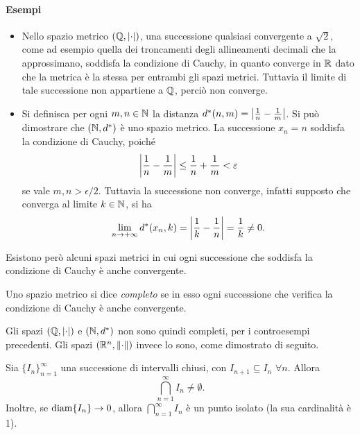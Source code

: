 \paragraph{Esempi}
\begin{itemize}
\item Nello spazio metrico $(\Q,\abs{\cdot})$, una successione qualsiasi convergente a $\sqrt{2}$, come ad esempio quella dei troncamenti degli allineamenti decimali che la approssimano, soddisfa la condizione di Cauchy, in quanto converge in $\R$ dato che la metrica è la stessa per entrambi gli spazi metrici. Tuttavia il limite di tale successione non appartiene a $\Q$, perciò non converge.
\item Si definisca per ogni $m,n\in\N$ la distanza $d^*(n,m)=\abs[\big]{\frac1{n}-\frac1{m}}$. Si può dimostrare che $(\N,d^*)$ è uno spazio metrico. La successione $x_n=n$ soddisfa la condizione di Cauchy, poiché
\[
	\abs[\bigg]{\frac1{n}-\frac1{m}}\leq\frac1{n}+\frac1{m}<\epsilon
\]
se vale $m,n>\epsilon/2$. Tuttavia la successione non converge, infatti supposto che converga al limite $k\in\N$, si ha
\[
	\lim_{n\to +\infty} d^*(x_n,k)=\abs[\bigg]{\frac1{k}-\frac1{n}}=\frac1{k}\neq 0.
\]
\end{itemize}
Esistono però alcuni spazi metrici in cui ogni successione che soddisfa la condizione di Cauchy è anche convergente.
\begin{definizione}
Uno spazio metrico si dice \emph{completo} se in esso ogni successione che verifica la condizione di Cauchy è anche convergente.
\end{definizione}
Gli spazi $(\Q,\abs{\cdot})$ e $(\N,d^*)$ non sono quindi completi, per i controesempi precedenti. Gli spazi $(\R^n,\norm{\cdot})$ invece lo sono, come dimostrato di seguito.
\begin{lemma}
Sia $\{I_n\}_{n=1}^{\infty}$ una successione di intervalli chiusi, con $I_{n+1}\subseteq I_n$ $\forall n$. Allora
\[
\bigcap_{n=1}^{\infty} I_n\neq\emptyset.
\]
Inoltre, se $\diam\{I_n\}\to 0$, allora $\bigcap_{n=1}^{\infty} I_n$ è un punto isolato (la sua cardinalità è 1).
\end{lemma}
